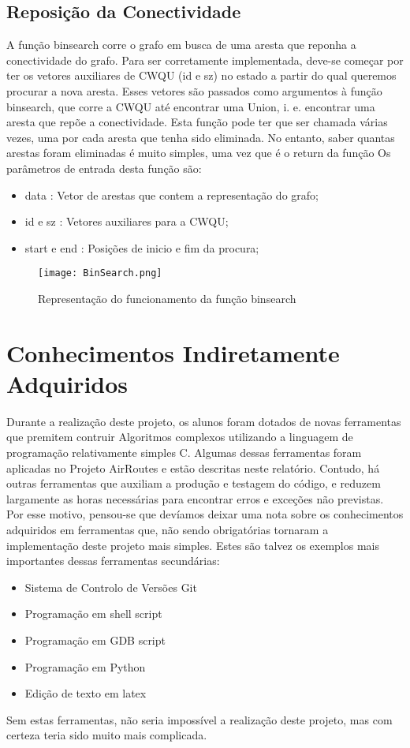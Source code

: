 \documentclass[14pt]{article}
\begin{document}
    \subsection[binsearch]{Reposição da Conectividade}
    A função binsearch corre o grafo em busca de uma aresta que reponha a conectividade do grafo.
    Para ser corretamente implementada, deve-se começar por ter os vetores auxiliares de CWQU (id e sz) no estado a partir
    do qual queremos procurar a nova aresta.
    Esses vetores são passados como argumentos à função binsearch, que corre a CWQU até encontrar uma Union, i. e. encontrar
    uma aresta que repõe a conectividade.
    Esta função pode ter que ser chamada várias vezes, uma por cada aresta que tenha sido eliminada. No entanto, saber quantas
    arestas foram eliminadas é muito simples, uma vez que é o return da função 
    Os parâmetros de entrada desta função são:
    \begin{itemize}
        \item data : Vetor de arestas que contem a representação do grafo;
        \item id e sz : Vetores auxiliares para a CWQU;
        \item start e end : Posições de inicio e fim da procura;
    \end{itemize}
    \begin{figure}[H]
        \centering
        \texttt{[image: BinSearch.png]}
        \label{fig:BinSearch}
        \caption{Representação do funcionamento da função binsearch}
    \end{figure}

    \section[Conhecimentos Secundários]{Conhecimentos Indiretamente Adquiridos}
    Durante a realização deste projeto, os alunos foram dotados de novas ferramentas que premitem contruir Algoritmos complexos
    utilizando a linguagem de programação relativamente simples C. Algumas dessas ferramentas foram aplicadas no Projeto AirRoutes
    e estão descritas neste relatório.
    Contudo, há outras ferramentas que auxiliam a produção e testagem do código, e reduzem largamente as horas necessárias para
    encontrar erros e exceções não previstas.
    Por esse motivo, pensou-se que devíamos deixar uma nota sobre os conhecimentos adquiridos em ferramentas que, não sendo obrigatórias
    tornaram a implementação deste projeto mais simples.
    Estes são talvez os exemplos mais importantes dessas ferramentas secundárias:
    \begin{itemize}
        \item Sistema de Controlo de Versões Git
        \item Programação em shell script
        \item Programação em GDB script
        \item Programação em Python
        \item Edição de texto em latex
    \end{itemize}
    Sem estas ferramentas, não seria impossível a realização deste projeto, mas com certeza teria sido muito mais complicada.
\end{document}
